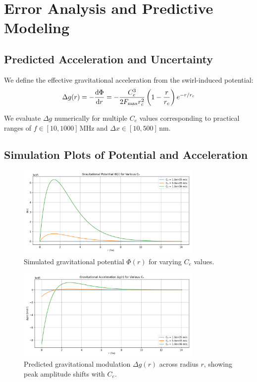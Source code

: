 \documentclass[12pt]{article}
\begin{document}
    \section*{Error Analysis and Predictive Modeling}

    \subsection*{Predicted Acceleration and Uncertainty}
    We define the effective gravitational acceleration from the swirl-induced potential:
    \begin{equation}
        \Delta g(r) = -\dv{\Phi}{r} = -\frac{C_e^3}{2 F_{\text{max}} r_c^2} \left(1 - \frac{r}{r_c}\right) e^{-r/r_c}
    \end{equation}

    We evaluate \( \Delta g \) numerically for multiple \( C_e \) values corresponding to practical ranges of \( f \in [10, 1000]\,\text{MHz} \) and \( \Delta x \in [10, 500]\,\text{nm} \).

    \subsection*{Simulation Plots of Potential and Acceleration}

    \begin{figure}[h!]
        \centering
        \includegraphics[width=0.8\textwidth]{plotG}
        \caption{Simulated gravitational potential \( \Phi(r) \) for varying \( C_e \) values.}
    \end{figure}

    \begin{figure}[h!]
        \centering
        \includegraphics[width=0.8\textwidth]{plotG2}
        \caption{Predicted gravitational modulation \( \Delta g(r) \) across radius \( r \), showing peak amplitude shifts with \( C_e \).}
    \end{figure}
\end{document}
